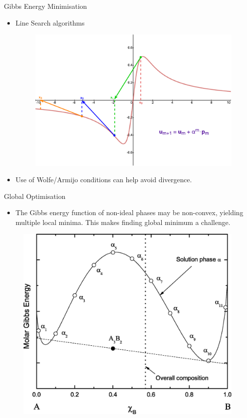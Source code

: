      \begin{frame}{Gibbs Energy Minimisation}
         \begin{itemize}
 	        \item Line Search algorithms
 	    \begin{figure}
 	        \centering
 	        \includegraphics[width=0.5\paperwidth]{Figures/Line_search.pdf}
 	    \end{figure}
 	        \item Use of Wolfe/Armijo conditions can help avoid divergence.
 	    \end{itemize}
     \end{frame}
    
     \begin{frame}{Global Optimisation}
         \begin{itemize}
             \item The Gibbs energy function of non-ideal phases may be non-convex, yielding multiple local minima. This makes finding global minimum a challenge.
         \end{itemize}
         \begin{figure}
             \centering
             \includegraphics[width=0.5\linewidth]{Figures/Global_opt1}
         \end{figure}
     \end{frame}
    
